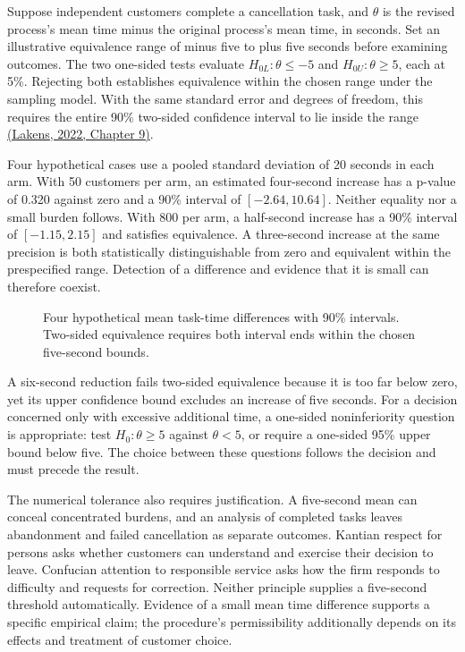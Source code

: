 Suppose independent customers complete a cancellation task, and
\(\theta\) is the revised process's mean time minus the original
process's mean time, in seconds. Set an illustrative equivalence range
of minus five to plus five seconds before examining outcomes. The two
one-sided tests evaluate \(H_{0L}:\theta\leq-5\) and
\(H_{0U}:\theta\geq5\), each at 5\%. Rejecting both establishes
equivalence within the chosen range under the sampling model. With the
same standard error and degrees of freedom, this requires the entire
90\% two-sided confidence interval to lie inside the range
\href{https://lakens.github.io/statistical_inferences/09-equivalencetest.html}{(Lakens,
2022, Chapter 9)}.

Four hypothetical cases use a pooled standard deviation of 20 seconds in
each arm. With 50 customers per arm, an estimated four-second increase
has a p-value of 0.320 against zero and a 90\% interval of
\([-2.64,10.64]\). Neither equality nor a small burden follows. With 800
per arm, a half-second increase has a 90\% interval of \([-1.15,2.15]\)
and satisfies equivalence. A three-second increase at the same precision
is both statistically distinguishable from zero and equivalent within
the prespecified range. Detection of a difference and evidence that it
is small can therefore coexist.

\begin{figure}[htbp]
\centering

\caption{Four hypothetical mean task-time differences with 90\% intervals. Two-sided equivalence requires both interval ends within the chosen five-second bounds.}\label{fig:M09_equivalence_and_burden}
\end{figure}

A six-second reduction fails two-sided equivalence because it is too far
below zero, yet its upper confidence bound excludes an increase of five
seconds. For a decision concerned only with excessive additional time, a
one-sided noninferiority question is appropriate: test
\(H_0:\theta\geq5\) against \(\theta<5\), or require a one-sided 95\%
upper bound below five. The choice between these questions follows the
decision and must precede the result.

The numerical tolerance also requires justification. A five-second mean
can conceal concentrated burdens, and an analysis of completed tasks
leaves abandonment and failed cancellation as separate outcomes. Kantian
respect for persons asks whether customers can understand and exercise
their decision to leave. Confucian attention to responsible service asks
how the firm responds to difficulty and requests for correction. Neither
principle supplies a five-second threshold automatically. Evidence of a
small mean time difference supports a specific empirical claim; the
procedure's permissibility additionally depends on its effects and
treatment of customer choice.

